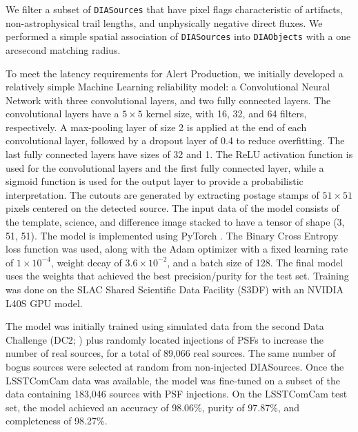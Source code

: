 We filter a subset of \texttt{DIASources} that have pixel flags characteristic of artifacts, non-astrophysical trail lengths, and unphysically negative direct fluxes.  
We performed a simple spatial association of \texttt{DIASources} into \texttt{DIAObjects} with a one arcsecond matching radius.

To meet the latency requirements for Alert Production, we initially developed a relatively simple Machine Learning reliability model: a Convolutional Neural Network with three convolutional layers, and two fully connected layers. 
The convolutional layers have a $5\times5$ kernel size, with 16, 32, and 64 filters, respectively. 
A max-pooling layer of size 2 is applied at the end of each convolutional layer, followed by a dropout layer of 0.4 to reduce overfitting. 
The last fully connected layers have sizes of 32 and 1. 
The ReLU activation function is used for the convolutional layers and the first fully connected layer, while a sigmoid function is used for the output layer to provide a probabilistic interpretation. 
The cutouts are generated by extracting postage stamps of $51\times51$ pixels centered on the detected source. 
The input data of the model consists of the template, science, and difference image stacked to have a tensor of shape (3, 51, 51). 
The model is implemented using PyTorch \citep{10.1145/3620665.3640366}. 
The Binary Cross Entropy loss function was used, along with the Adam optimizer with a fixed learning rate of $1\times10^{-4}$, weight decay of $3.6\times10^{-2}$, and a batch size of 128.
The final model uses the weights that achieved the best precision/purity for the test set. 
Training was done on the SLAC Shared Scientific Data Facility (S3DF) with an NVIDIA L40S GPU model.

The model was initially trained using simulated data from the second Data Challenge (DC2; \citep{2021ApJS..253...31L}) plus randomly located injections of PSFs to increase the number of real sources, for a total of 89,066 real sources. 
The same number of bogus sources were selected at random from non-injected DIASources. 
Once the  LSSTComCam data was available, the model was fine-tuned on a subset of the data containing 183,046 sources with PSF injections.
On the LSSTComCam test set, the model achieved an accuracy of 98.06\%, purity of 97.87\%, and completeness of 98.27\%.

